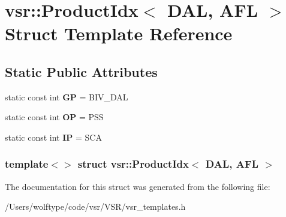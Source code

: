 \hypertarget{structvsr_1_1_product_idx_3_01_d_a_l_00_01_a_f_l_01_4}{\section{vsr\-:\-:Product\-Idx$<$ D\-A\-L, A\-F\-L $>$ Struct Template Reference}
\label{structvsr_1_1_product_idx_3_01_d_a_l_00_01_a_f_l_01_4}
}
\subsection*{Static Public Attributes}
\begin{DoxyCompactItemize}
\item 
\hypertarget{structvsr_1_1_product_idx_3_01_d_a_l_00_01_a_f_l_01_4_adc96317715fb07db61a265e82f591301}{static const int {\bfseries G\-P} = B\-I\-V\-\_\-\-D\-A\-L}\label{structvsr_1_1_product_idx_3_01_d_a_l_00_01_a_f_l_01_4_adc96317715fb07db61a265e82f591301}

\item 
\hypertarget{structvsr_1_1_product_idx_3_01_d_a_l_00_01_a_f_l_01_4_ac4fc14f4ad9cc81d8ce9f6bc2ce03ae0}{static const int {\bfseries O\-P} = P\-S\-S}\label{structvsr_1_1_product_idx_3_01_d_a_l_00_01_a_f_l_01_4_ac4fc14f4ad9cc81d8ce9f6bc2ce03ae0}

\item 
\hypertarget{structvsr_1_1_product_idx_3_01_d_a_l_00_01_a_f_l_01_4_a478977389b922b0bb5b3fe750aabb270}{static const int {\bfseries I\-P} = S\-C\-A}\label{structvsr_1_1_product_idx_3_01_d_a_l_00_01_a_f_l_01_4_a478977389b922b0bb5b3fe750aabb270}

\end{DoxyCompactItemize}
\subsubsection*{template$<$$>$ struct vsr\-::\-Product\-Idx$<$ D\-A\-L, A\-F\-L $>$}



The documentation for this struct was generated from the following file\-:\begin{DoxyCompactItemize}
\item 
/\-Users/wolftype/code/vsr/\-V\-S\-R/vsr\-\_\-templates.\-h\end{DoxyCompactItemize}
